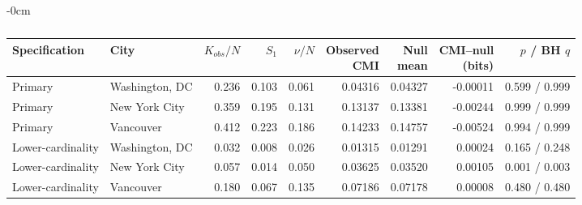 \begin{table}[!htbp]
\caption{}
\label{tab:revision_calibration}
\centering
\color{red}
\begin{adjustwidth}{-\extralength}{0cm}
\footnotesize
\setlength{\tabcolsep}{2.3pt}
\begin{tabular*}{\linewidth}{@{\extracolsep{\fill}}llrrrrrrr@{}}
\toprule
\textbf{Specification} & \textbf{City} & \textbf{$K_{obs}/N$} & \textbf{$S_1$} & \textbf{$\nu/N$} & \shortstack{\textbf{Observed}\\\textbf{CMI}} & \shortstack{\textbf{Null}\\\textbf{mean}} & \shortstack{\textbf{CMI--null}\\\textbf{(bits)}} & \textbf{$p$ / BH $q$}\\
\midrule
Primary & Washington, DC & 0.236 & 0.103 & 0.061 & 0.04316 & 0.04327 & -0.00011 & 0.599 / 0.999\\
Primary & New York City & 0.359 & 0.195 & 0.131 & 0.13137 & 0.13381 & -0.00244 & 0.999 / 0.999\\
Primary & Vancouver & 0.412 & 0.223 & 0.186 & 0.14233 & 0.14757 & -0.00524 & 0.994 / 0.999\\
Lower-cardinality & Washington, DC & 0.032 & 0.008 & 0.026 & 0.01315 & 0.01291 & 0.00024 & 0.165 / 0.248\\
Lower-cardinality & New York City & 0.057 & 0.014 & 0.050 & 0.03625 & 0.03520 & 0.00105 & 0.001 / 0.003\\
Lower-cardinality & Vancouver & 0.180 & 0.067 & 0.135 & 0.07186 & 0.07178 & 0.00008 & 0.480 / 0.480\\
\bottomrule
\end{tabular*}
\end{adjustwidth}
\begin{flushleft}
\footnotesize {}
\end{flushleft}
\end{table}
